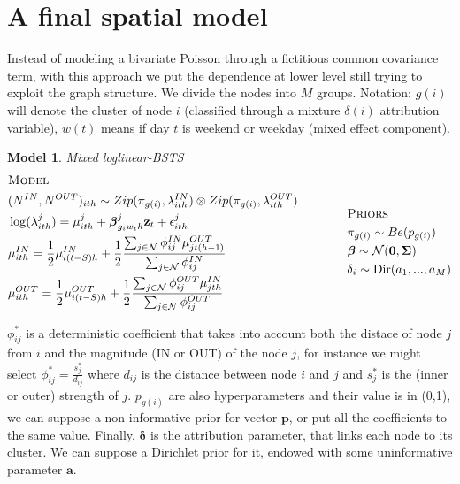 \documentclass[11pt,twoside]{report}
\newtheorem{model}{Model}
\begin{document}
\section{A final spatial model}
Instead of modeling a bivariate Poisson through a fictitious common covariance term, with this approach we put the dependence at lower level still trying to  exploit the graph structure. We divide the nodes into $M$ groups. Notation: $ g(i) $ will denote the cluster of node $ i $ (classified through a mixture $ \delta(i) $ attribution variable), $ w(t) $ means if day $ t $ is weekend or weekday (mixed effect component).

\begin{model} Mixed loglinear-BSTS\\
\begin{equation*}
\begin{aligned}
&\textsc{Model}\\
&(N^{IN}, N^{OUT})_{ith}\sim Zip(\pi_{g(i)},\lambda_{ith}^{IN})\otimes Zip(\pi_{g(i)},\lambda_{ith}^{OUT})\\
&\log(\lambda^{j}_{ith}) = \mu^{j}_{ith}+\boldsymbol{\beta}^j_{g_iw_th}\mathbf{z}_t + \epsilon_{ith}^j\\
&\mu_{ith}^{IN} = \frac{1}{2} \mu^{IN}_{i(t-S)h} + \frac{1}{2} \frac{\sum_{j \in \mathcal{N}} \phi^{IN}_{ij}\mu_{jt(h-1)}^{OUT}}{\sum_{j \in \mathcal{N}} \phi^{IN}_{ij}}\\
&\mu_{ith}^{OUT} = \frac{1}{2} \mu^{OUT}_{i(t-S)h} + \frac{1}{2} \frac{\sum_{j \in \mathcal{N}} \phi^{OUT}_{ij}\mu_{jth}^{IN}}{\sum_{j \in \mathcal{N}} \phi^{OUT}_{ij}}\\
\end{aligned}
\qquad \qquad
\begin{aligned}[c]
&\textsc{Priors}\\
&\pi_{g(i)} \sim Be(p_{g(i)})\\
&\boldsymbol{\beta} \sim \mathcal{N}(\mathbf{0},\boldsymbol{\Sigma})\\
&\mathbf{\delta}_i \sim \mathrm{Dir}(a_1,...,a_M)
\end{aligned}
\end{equation*}
\end{model}

$ \phi_{ij}^* $ is a deterministic coefficient that takes into account both the distace of node $ j $ from $ i $ and the magnitude (IN or OUT) of the node $ j $, for instance we might select $ \phi_{ij}^*=\frac{s^*_j}{d_{ij}} $ where $ d_{ij} $ is the distance between node $ i $ and $ j $ and $ s_j^* $ is the (inner or outer) strength of $ j $. $ p_{g(i)} $ are also hyperparameters and their value is in (0,1), we can suppose a non-informative prior for vector $ \mathbf{p} $, or put all the coefficients to the same value. Finally, $ \boldsymbol{\delta} $ is the attribution parameter, that links each node to its cluster. We can suppose a Dirichlet prior for it, endowed with some uninformative parameter $ \mathbf{a} $. 
\end{document}

